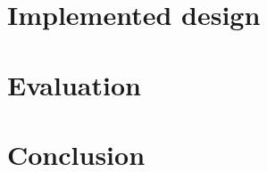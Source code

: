 \documentclass[
a4paper,
12pt,
notitlepage,
parskip=half,
DIV=11,
]{scrbook}
\begin{document}
	\chapter{Implemented design}
	\chapter{Evaluation}
	\chapter{Conclusion}
	
	
	
	
\end{document}
